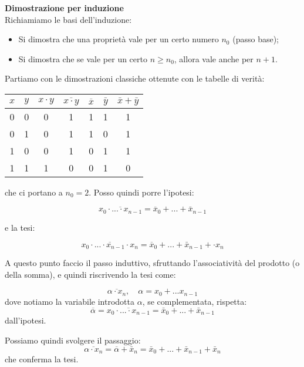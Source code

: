 \documentclass[a4paper,11pt]{article}
\begin{document}
\noindent
\textbf{\textsf{Dimostrazione per induzione}} \\
Richiamiamo le basi dell'induzione:
\begin{itemize}
	\item Si dimostra che una proprietà vale per un certo numero $n_0$ (passo base);
	\item Si dimostra che se vale per un certo $n \geq n_0$, allora vale anche per $n + 1$.
\end{itemize}

Partiamo con le dimostrazioni classiche ottenute con le tabelle di verità:

\begin{table}[H]
	\center
	\begin{tabular} { c  c | c | c | c | c | c }
		$x$ & $y$ & $ x \cdot y $ & $\overline{x \cdot y}$ & $\overline{x}$ & $\bar{y}$ & $\bar{x} + \bar{y}$ \\ 
		\hline 
		0 & 0 & 0 & 1 & 1 & 1 & 1 \\  
		0 & 1 & 0 & 1 & 1 & 0 & 1 \\ 
		1 & 0 & 0 & 1 & 0 & 1 & 1 \\ 
		1 & 1 & 1 & 0 & 0 & 1 & 0
	\end{tabular}
\end{table}

che ci portano a $n_0 = 2$.
Posso quindi porre l'ipotesi:

$$
\overline{x_0 \cdot ... \cdot x_{n-1}} = \overline{x}_0 + ... + \bar{x}_{n-1}
$$

e la tesi:

$$
\overline{x_0 \cdot ... \cdot x_{n-1} \cdot x_n} = \overline{x}_0 + ... + \bar{x}_{n-1} + \cdot x_n
$$

A questo punto faccio il passo induttivo, sfruttando l'associatività del prodotto (o della somma), e quindi riscrivendo la tesi come:

$$
\overline{\alpha \cdot x_n}, \quad \alpha = x_0 + ... x_{n-1} 
$$
dove notiamo la variabile introdotta $\alpha$, se complementata, rispetta:
$$
\overline{\alpha} = \overline{x_0 \cdot ... \cdot x_{n-1}} = \bar{x}_0 + ... + \bar{x}_{n-1}
$$
dall'ipotesi.

Possiamo quindi svolgere il passaggio:
$$
\overline{\alpha \cdot x_n} = \overline{\alpha} + \bar{x}_n =  \bar{x}_0 + ... + \bar{x}_{n-1} + \bar{x}_n
$$
che conferma la tesi.
\end{document}

